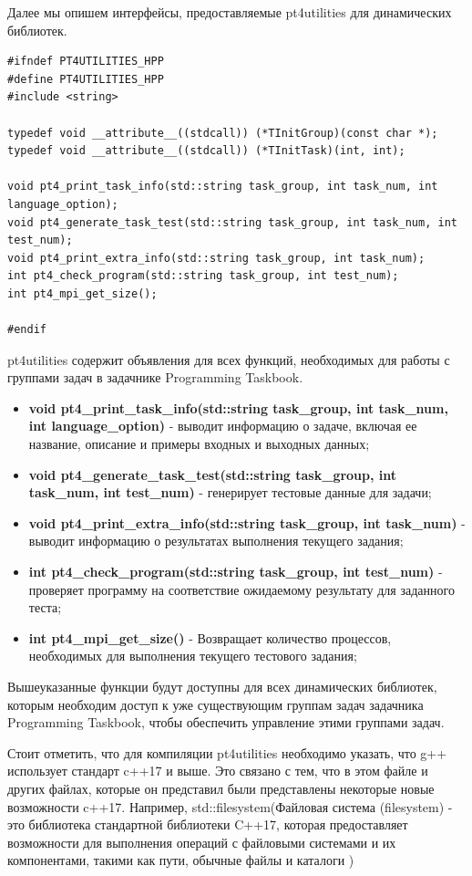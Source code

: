  Далее мы опишем интерфейсы, предоставляемые pt4utilities для динамических библиотек.

\lstset{language=c++}
\begin{lstlisting}
#ifndef PT4UTILITIES_HPP
#define PT4UTILITIES_HPP
#include <string>

typedef void __attribute__((stdcall)) (*TInitGroup)(const char *);
typedef void __attribute__((stdcall)) (*TInitTask)(int, int);

void pt4_print_task_info(std::string task_group, int task_num, int language_option);
void pt4_generate_task_test(std::string task_group, int task_num, int test_num);
void pt4_print_extra_info(std::string task_group, int task_num);
int pt4_check_program(std::string task_group, int test_num);
int pt4_mpi_get_size();

#endif
\end{lstlisting}

pt4utilities содержит объявления для всех функций, необходимых для работы с группами 
задач в задачнике Programming Taskbook.

\begin{itemize}
	\item \textbf{void pt4\_print\_task\_info(std::string task\_group, int task\_num, int language\_option)} - выводит информацию о задаче, включая ее название, описание и примеры входных и выходных данных;
	\item \textbf{void pt4\_generate\_task\_test(std::string task\_group, int task\_num, int test\_num)} - генерирует тестовые данные для задачи;
	\item \textbf{void pt4\_print\_extra\_info(std::string task\_group, int task\_num)} - выводит информацию о результатах выполнения текущего задания;
	\item \textbf{int pt4\_check\_program(std::string task\_group, int test\_num)} - проверяет программу на соответствие ожидаемому результату для заданного теста;
	\item \textbf{int pt4\_mpi\_get\_size()} - Возвращает количество процессов, необходимых для выполнения текущего тестового задания;
\end{itemize}

Вышеуказанные функции будут доступны для всех динамических библиотек, которым необходим 
доступ к уже существующим группам задач задачника Programming Taskbook, чтобы обеспечить 
управление этими группами задач.

Стоит отметить, что для компиляции pt4utilities необходимо указать, что g++ использует стандарт c++17 
и выше. Это связано с тем, что в этом файле и других файлах, которые он представил 
были представлены некоторые новые возможности c++17. 
Например, std::filesystem(Файловая система (filesystem) - это библиотека стандартной библиотеки 
C++17, которая предоставляет возможности для выполнения операций с файловыми системами и их 
компонентами, такими как пути, обычные файлы и каталоги \cite{cppreference})

